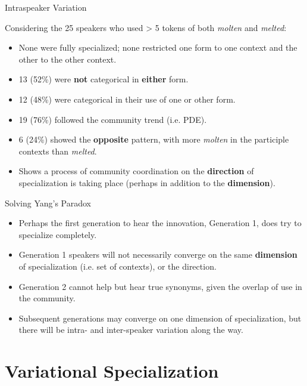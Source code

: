 \documentclass[hyperref={pdfpagelabels=false}]{beamer}
\begin{document}
\begin{frame}{Intraspeaker Variation}

\begin{center}
	Considering the 25 speakers who used > 5 tokens of both \textsl{molten} and \textsl{melted}:
\end{center}
\begin{itemize}
		\item None were fully specialized; none restricted one form to one context and the other to the other context.
	\item[] 13 (52\%) were \textbf{not} categorical in \textbf{either} form.
	\item[] 12 (48\%) were categorical in their use of one or other form.
	\item[] 19 (76\%) followed the community trend (i.e. PDE).
	\item[] 6 \hspace*{2mm}(24\%) showed the \textbf{opposite} pattern, with more \textsl{molten} in the participle contexts than \textsl{melted}.
	\item Shows a process of community coordination on the \textbf{direction} of specialization is taking place (perhaps in addition to the \textbf{dimension}).
\end{itemize}



\end{frame}


\begin{frame}{Solving Yang's Paradox}
		\begin{itemize}
			\item Perhaps the first generation to hear the innovation, Generation 1, does try to specialize completely.
			\item Generation 1 speakers will not necessarily converge on the same \textbf{dimension} of specialization (i.e. set of contexts), or the direction.
			\item Generation 2 cannot help but hear true synonyms, given the overlap of use in the community.
			\item Subsequent generations may converge on one dimension of specialization, but there will be intra- and inter-speaker variation along the way.
		\end{itemize}
\end{frame}


\section{Variational Specialization}
\end{document}
